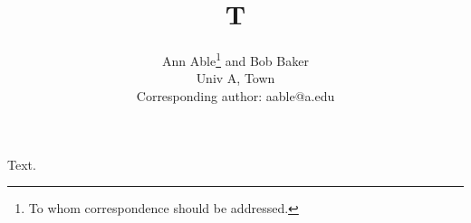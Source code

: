 \documentclass{article}
\title{T}
\author{Ann Able\thanks{To whom correspondence should be addressed.} and Bob Baker\\
Univ A, Town\\
Corresponding author: aable@a.edu}
\date{}
\begin{document}
\maketitle
Text.
\end{document}
